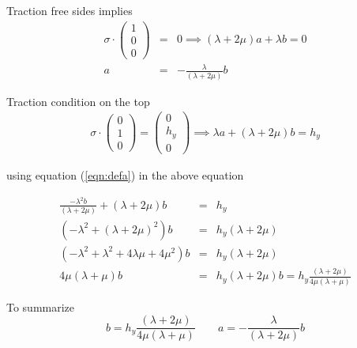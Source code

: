 \documentclass[12pt]{article}
\newcommand{\beq}{\begin{equation}}
\newcommand{\eeq}{\end{equation}}
\newcommand{\ber}{\begin{eqnarray}}
\newcommand{\eer}{\end{eqnarray}}
\begin{document}
      
 Traction free sides implies
      \ber
      \sigma\cdot\begin{pmatrix}1 \\ 0 \\ 0\end{pmatrix} &=& 0 \implies      (\lambda+2\mu)a + \lambda{b}=0 \\
      a &=& -\frac{\lambda}{(\lambda+2\mu)}b \label{eqn:defa}
      \eer

      Traction condition on the top
      \ber
      \sigma\cdot\begin{pmatrix}0\\1\\0\end{pmatrix} = \begin{pmatrix}0\\h_y\\0\end{pmatrix} \implies \lambda{a} + (\lambda+2\mu)b = h_y
        \eer

        using equation (\ref{eqn:defa}) in the above equation

        \ber
        \frac{-\lambda^2b}{(\lambda+2\mu)} + (\lambda+2\mu)b &=& h_y \\
        (-\lambda^2 + (\lambda+2\mu)^2)b &=& h_y(\lambda+2\mu)\\
        (-\lambda^2 + \lambda^2 + 4\lambda\mu + 4\mu^2)b &=& h_y(\lambda+2\mu)\\
        4\mu(\lambda+\mu)b &=& h_y(\lambda+2\mu)
        b = h_y\frac{(\lambda+2\mu)}{4\mu(\lambda+\mu)}
        \eer

        To summarize
        \beq
        b = h_y\frac{(\lambda+2\mu)}{4\mu(\lambda+\mu)} \qquad  a = -\frac{\lambda}{(\lambda+2\mu)}b 
        \eeq
        
\end{document}
